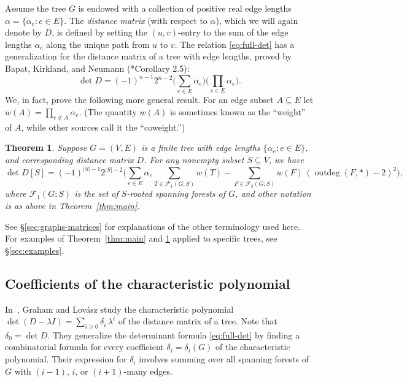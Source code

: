 \documentclass[12pt]{amsart}
\newtheorem{mainthm}{Theorem}
\theoremstyle{definition}
\newcommand{\Da}{{D}}
\newcommand{\trees}{\mathcal{F}_1}
\newcommand{\forests}{\mathcal{F}}
\DeclareMathOperator{\outdeg}{outdeg}
\begin{document}
Assume the tree $G$ is endowed with a collection of positive real edge lengths $\alpha = \{\alpha_e \colon e\in E\}$. 
The {\em distance matrix} (with respect to $\alpha$), which we will again denote by $\Da$, is defined by setting the $(u,v)$-entry to the sum of the edge lengths $\alpha_e$ along the unique path from $u$ to $v$.
The relation \eqref{eq:full-det} has a generalization for the distance matrix of a tree with edge lengths, proved by Bapat, Kirkland, and Neumann (\cite{bapat-kirkland-neumann}*{Corollary 2.5}):
\begin{equation}\label{eq:w-full-det}
	\det \Da = (-1)^{n-1} 2^{n-2} \Big(\sum_{e \in E} \alpha_e\Big) \Big( \prod_{e \in E} \alpha_e \Big).
\end{equation}
We, in fact, prove the following more general result. 
For an edge subset $A \subseteq E$ 
let $w(A) = \prod_{e \not\in A} \alpha_e$.
(The quantity $w(A)$ is sometimes known as the ``weight'' of $A$, while other sources call it the ``coweight.'')
\begin{mainthm}\label{thm:w-main}
	Suppose $G = (V,E)$ is a finite tree with edge lengths $\{\alpha_e \colon e \in E\}$, and corresponding distance matrix $\Da$. 
	For any nonempty subset $S \subseteq V$, we have
	\begin{equation}\label{eq:w-main}
		\det \Da[S] = (-1)^{|S|-1} 2^{|S|-2} \Bigg( \sum_{e \in E}\alpha_e \!\!\!\! \sum_{T \in \trees(G;S)} \!\! w(T) - \!\!\!\!\sum_{F \in \forests_2(G;S)} \!\!w(F)\, (\outdeg(F,*) - 2)^2 \!\Bigg),
	\end{equation}
	where 
	$\trees(G;S)$ is the set of $S$-rooted spanning forests of $G$,
	and other notation is as above in Theorem~\ref{thm:main}.
\end{mainthm}
See \S\ref{sec:graphs-matrices} for explanations of the other terminology used here.
For examples of Theorem~\ref{thm:main} and \ref{thm:w-main} applied to specific trees, see \S\ref{sec:examples}.




\subsection{Coefficients of the characteristic polynomial}

In~\cite{graham-lovasz}, Graham and Lov\'asz study
the characteristic polynomial 
$
    \det(D - \lambda I) = \sum_{i \geq 0} \delta_i\, \lambda^i
$
of the distance matrix of a tree.
Note that $\delta_0 = \det D$.
They generalize the determinant formula \eqref{eq:full-det} by finding a combinatorial formula for every coefficient $\delta_i = \delta_i(G)$ of the characteristic polynomial.
Their expression for $\delta_i$ involves summing over all spanning forests of $G$ with $(i - 1)$, $i$, or $(i + 1)$-many edges.
\end{document}
